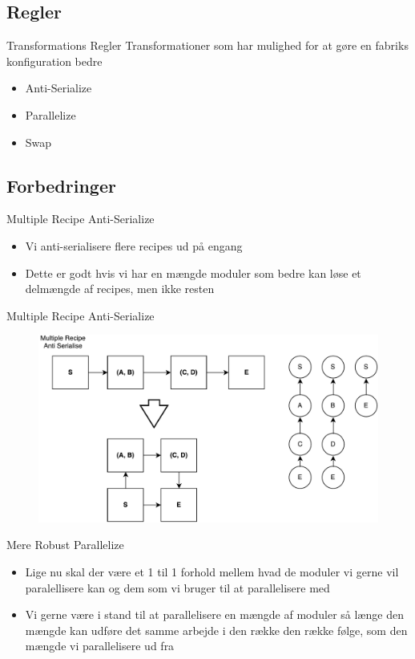 \subsection{Regler}
\begin{frame}{Transformations Regler}
	Transformationer som har mulighed for at gøre en fabriks konfiguration bedre
	\begin{itemize}
		\item Anti-Serialize
		\item Parallelize
		\item Swap		
	\end{itemize}
\end{frame}


\subsection{Forbedringer}
\begin{frame}{Multiple Recipe Anti-Serialize}
	\begin{itemize}
		\item Vi anti-serialisere flere recipes ud på engang
		\item Dette er godt hvis vi har en mængde moduler som bedre kan løse et delmængde af recipes, men ikke resten
	\end{itemize}
\end{frame}

\begin{frame} {Multiple Recipe Anti-Serialize}
	\begin{figure}
		\centering
		\includegraphics[width=1\textwidth]{figures/mras.pdf}
	\end{figure}
\end{frame}

\begin{frame}{Mere Robust Parallelize}
	\begin{itemize}
		\item Lige nu skal der være et 1 til 1 forhold mellem hvad de moduler vi gerne vil paralellisere kan og dem som vi bruger til at parallelisere med
		\item Vi gerne være i stand til at parallelisere en mængde af moduler så længe den mængde kan udføre det samme arbejde i den række den række følge, som den mængde vi parallelisere ud fra
	\end{itemize}
\end{frame}

